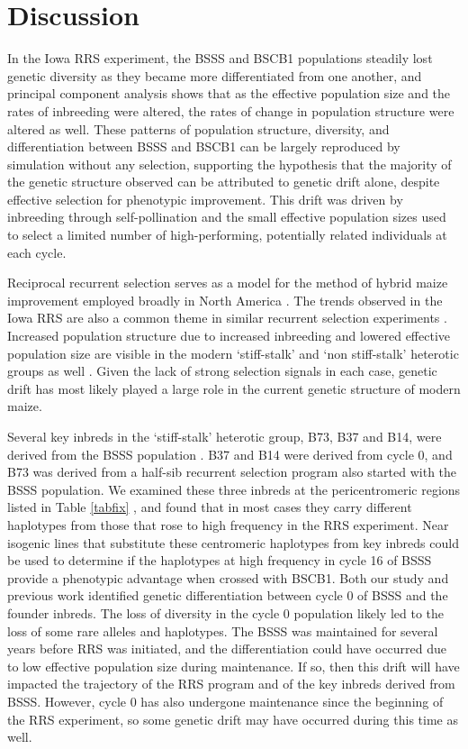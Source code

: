 \section*{Discussion}
 
In the Iowa RRS experiment, the BSSS and BSCB1 populations steadily lost genetic diversity as they became more differentiated from one another, and principal component analysis shows that as the effective population size and the rates of inbreeding were altered, the rates of change in population structure were altered as well. 
These patterns of population structure, diversity, and differentiation between BSSS and BSCB1 can be largely reproduced by simulation without any selection, supporting the hypothesis that the majority of the genetic structure observed can be attributed to genetic drift alone, despite effective selection for phenotypic improvement. 
This drift was driven by inbreeding through self-pollination and the small effective population sizes used to select a limited number of high-performing, potentially related individuals at each cycle.  

Reciprocal recurrent selection serves as a model for the method of hybrid maize improvement employed broadly in North America \citep{duvick2004long}.
The trends observed in the Iowa RRS are also a common theme in similar recurrent selection experiments \citep{Romay2013,lamkey2014relative}. 
Increased population structure due to increased inbreeding and lowered effective population size are visible in the modern ‘stiff-stalk’ and ‘non stiff-stalk’ heterotic groups as well \citep{van2012historical}. 
Given the lack of strong selection signals in each case, genetic drift has most likely played a large role in the current genetic structure of modern maize. 
	
Several key inbreds in the ‘stiff-stalk’ heterotic group, B73, B37 and B14, were derived from the BSSS population \citep{darrah19861985, 1986; troyer1999background}. 
B37 and B14 were derived from cycle 0, and B73 was derived from a half-sib recurrent selection program also started with the BSSS population. 
We examined these three inbreds at the pericentromeric regions listed in Table \ref{tabfix} , and found that in most cases they carry different haplotypes from those that rose to high frequency in the RRS experiment.  
Near isogenic lines that substitute these centromeric haplotypes from key inbreds could be used to determine if the haplotypes at high frequency in cycle 16 of BSSS provide a phenotypic advantage when crossed with BSCB1. 
Both our study and previous work \citep{labate1997molecular} identified genetic differentiation between cycle 0 of BSSS and the founder inbreds. 
The loss of diversity in the cycle 0 population likely led to the loss of some rare alleles and haplotypes. 
The BSSS was maintained for several years before RRS was initiated, and the differentiation could have occurred due to low effective population size during maintenance. 
If so, then this drift will have impacted the trajectory of the RRS program and of the key inbreds derived from BSSS. 
However, cycle 0 has also undergone maintenance since the beginning of the RRS experiment, so some genetic drift may have occurred during this time as well.
	
